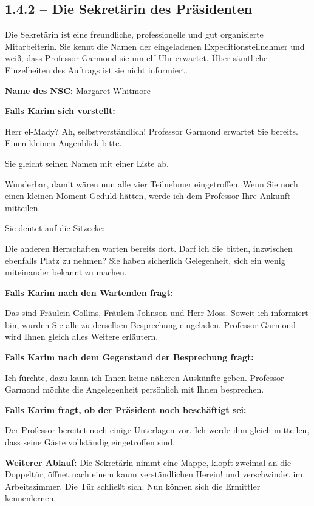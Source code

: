 \subsection{1.4.2 -- Die Sekretärin des Präsidenten}
\begin{meisterinfo}
Die Sekretärin ist eine freundliche, professionelle und gut organisierte Mitarbeiterin. Sie kennt die Namen der eingeladenen Expeditionsteilnehmer und wei\ss{}, dass Professor Garmond sie um elf Uhr erwartet. Über sämtliche Einzelheiten des Auftrags ist sie nicht informiert.

\textbf{Name des NSC:} Margaret Whitmore 

\medskip\textbf{Falls Karim sich vorstellt:}

\glqq{}Herr el-Mady? Ah, selbstverständlich! Professor Garmond erwartet Sie bereits. Einen kleinen Augenblick bitte.\grqq{}

Sie gleicht seinen Namen mit einer Liste ab.

\glqq{}Wunderbar, damit wären nun alle vier Teilnehmer eingetroffen. Wenn Sie noch einen kleinen Moment Geduld hätten, werde ich dem Professor Ihre Ankunft mitteilen.\grqq{}

Sie deutet auf die Sitzecke:

\glqq{}Die anderen Herrschaften warten bereits dort. Darf ich Sie bitten, inzwischen ebenfalls Platz zu nehmen? Sie haben sicherlich Gelegenheit, sich ein wenig miteinander bekannt zu machen.\grqq{}

\medskip\textbf{Falls Karim nach den Wartenden fragt:}

\glqq{}Das sind Fräulein Collins, Fräulein Johnson und Herr Moss. Soweit ich informiert bin, wurden Sie alle zu derselben Besprechung eingeladen. Professor Garmond wird Ihnen gleich alles Weitere erläutern.\grqq{}

\medskip\textbf{Falls Karim nach dem Gegenstand der Besprechung fragt:}

\glqq{}Ich fürchte, dazu kann ich Ihnen keine näheren Auskünfte geben. Professor Garmond möchte die Angelegenheit persönlich mit Ihnen besprechen.\grqq{}

\medskip\textbf{Falls Karim fragt, ob der Präsident noch beschäftigt sei:}

\glqq{}Der Professor bereitet noch einige Unterlagen vor. Ich werde ihm gleich mitteilen, dass seine Gäste vollständig eingetroffen sind.\grqq{}

\medskip\textbf{Weiterer Ablauf:} Die Sekretärin nimmt eine Mappe, klopft zweimal an die Doppeltür, öffnet nach einem kaum verständlichen \glqq{}Herein!\grqq{} und verschwindet im Arbeitszimmer. Die Tür schlie\ss{}t sich. Nun können sich die Ermittler kennenlernen.
\end{meisterinfo}

